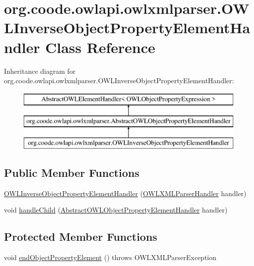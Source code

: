 \hypertarget{classorg_1_1coode_1_1owlapi_1_1owlxmlparser_1_1_o_w_l_inverse_object_property_element_handler}{\section{org.\-coode.\-owlapi.\-owlxmlparser.\-O\-W\-L\-Inverse\-Object\-Property\-Element\-Handler Class Reference}
\label{classorg_1_1coode_1_1owlapi_1_1owlxmlparser_1_1_o_w_l_inverse_object_property_element_handler}
}
Inheritance diagram for org.\-coode.\-owlapi.\-owlxmlparser.\-O\-W\-L\-Inverse\-Object\-Property\-Element\-Handler\-:\begin{figure}[H]
\begin{center}
\leavevmode
\includegraphics[height=3.000000cm]{classorg_1_1coode_1_1owlapi_1_1owlxmlparser_1_1_o_w_l_inverse_object_property_element_handler}
\end{center}
\end{figure}
\subsection*{Public Member Functions}
\begin{DoxyCompactItemize}
\item 
\hyperlink{classorg_1_1coode_1_1owlapi_1_1owlxmlparser_1_1_o_w_l_inverse_object_property_element_handler_aa5101ec925fcf693fc72c5ef888b3fc4}{O\-W\-L\-Inverse\-Object\-Property\-Element\-Handler} (\hyperlink{classorg_1_1coode_1_1owlapi_1_1owlxmlparser_1_1_o_w_l_x_m_l_parser_handler}{O\-W\-L\-X\-M\-L\-Parser\-Handler} handler)
\item 
void \hyperlink{classorg_1_1coode_1_1owlapi_1_1owlxmlparser_1_1_o_w_l_inverse_object_property_element_handler_ac535655d6fd8470f930d75c956a4db20}{handle\-Child} (\hyperlink{classorg_1_1coode_1_1owlapi_1_1owlxmlparser_1_1_abstract_o_w_l_object_property_element_handler}{Abstract\-O\-W\-L\-Object\-Property\-Element\-Handler} handler)
\end{DoxyCompactItemize}
\subsection*{Protected Member Functions}
\begin{DoxyCompactItemize}
\item 
void \hyperlink{classorg_1_1coode_1_1owlapi_1_1owlxmlparser_1_1_o_w_l_inverse_object_property_element_handler_ae4cf0cb6f1882074dc1f1fa46ce86b37}{end\-Object\-Property\-Element} ()  throws O\-W\-L\-X\-M\-L\-Parser\-Exception 
\end{DoxyCompactItemize}
